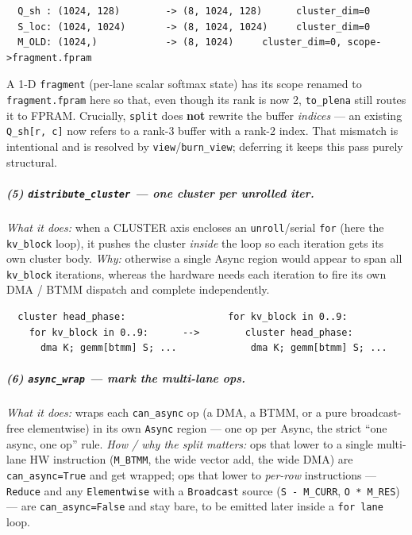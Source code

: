 \documentclass[
  10pt,
]{article}
\begin{document}
\begin{verbatim}
  Q_sh : (1024, 128)        -> (8, 1024, 128)      cluster_dim=0
  S_loc: (1024, 1024)       -> (8, 1024, 1024)     cluster_dim=0
  M_OLD: (1024,)            -> (8, 1024)     cluster_dim=0, scope->fragment.fpram
\end{verbatim}

A 1-D \texttt{fragment} (per-lane scalar softmax state) has its scope
renamed to \texttt{fragment.fpram} here so that, even though its rank is
now 2, \texttt{to\_plena} still routes it to FPRAM. Crucially,
\texttt{split} does \textbf{not} rewrite the buffer \emph{indices} ---
an existing \texttt{Q\_sh[r, c]} now refers to a rank-3 buffer with a
rank-2 index. That mismatch is intentional and is resolved by
\texttt{view}/\texttt{burn\_view}; deferring it keeps this pass purely
structural.

\subparagraph{(5) \texttt{distribute\_cluster} --- one cluster per
unrolled iter.}\label{fa-distribute} \emph{What it does:} when a CLUSTER
axis encloses an \texttt{unroll}/serial \texttt{for} (here the
\texttt{kv\_block} loop), it pushes the cluster \emph{inside} the loop so
each iteration gets its own cluster body. \emph{Why:} otherwise a single
Async region would appear to span all \texttt{kv\_block} iterations,
whereas the hardware needs each iteration to fire its own DMA / BTMM
dispatch and complete independently.

\begin{verbatim}
  cluster head_phase:                  for kv_block in 0..9:
    for kv_block in 0..9:      -->        cluster head_phase:
      dma K; gemm[btmm] S; ...             dma K; gemm[btmm] S; ...
\end{verbatim}

\subparagraph{(6) \texttt{async\_wrap} --- mark the multi-lane
ops.}\label{fa-async} \emph{What it does:} wraps each \texttt{can\_async}
op (a DMA, a BTMM, or a pure broadcast-free elementwise) in its own
\texttt{Async} region --- one op per Async, the strict ``one async, one
op'' rule. \emph{How / why the split matters:} ops that lower to a single
multi-lane HW instruction (\texttt{M\_BTMM}, the wide vector add, the
wide DMA) are \texttt{can\_async=True} and get wrapped; ops that lower to
\emph{per-row} instructions --- \texttt{Reduce} and any
\texttt{Elementwise} with a \texttt{Broadcast} source (\texttt{S -
M\_CURR}, \texttt{O * M\_RES}) --- are \texttt{can\_async=False} and stay
bare, to be emitted later inside a \texttt{for lane} loop.
\end{document}
